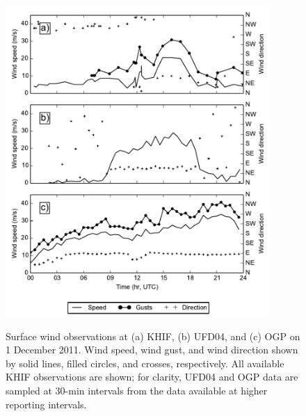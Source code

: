 \documentclass[pdftex,12pt]{article}
\def\mps{m\,s$^{-1}$}
\begin{document}
\begin{figure}[t]
\centering
\includegraphics[width=0.9\textwidth]{obs_comp.pdf}\\
\caption{Surface wind observations at (a) KHIF, (b) UFD04, and (c) OGP on 1 December 2011. Wind speed, wind gust, and wind direction shown by solid lines, filled circles, and crosses, respectively. All available KHIF observations are shown; for clarity, UFD04 and OGP data are sampled at 30-min intervals from the data available at higher reporting intervals.}
\label{fig:ob_ts}
\end{figure}


\end{document}
